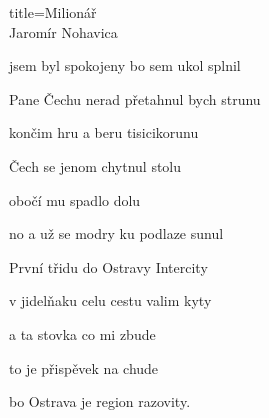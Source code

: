\begin{song}{title=\centering Milionář \\\normalsize Jaromír Nohavica  \vspace*{-0.3cm}}
{\begin{minipage}[t]{0.48\textwidth}
jsem byl spokojeny bo sem ukol splnil 

\sloka
Pane Čechu nerad přetahnul bych strunu 

končim hru a beru tisicikorunu 

Čech se jenom chytnul stolu 

obočí mu spadlo dolu 

no a už se modry ku podlaze sunul 

\sloka
První třidu do Ostravy Intercity 

v jidelňaku celu cestu valim kyty 

a ta stovka co mi zbude 

to je přispěvek na chude 

bo Ostrava je region razovity.


\end{minipage}
}
\setcounter{Slokočet}{0}
\end{song}
